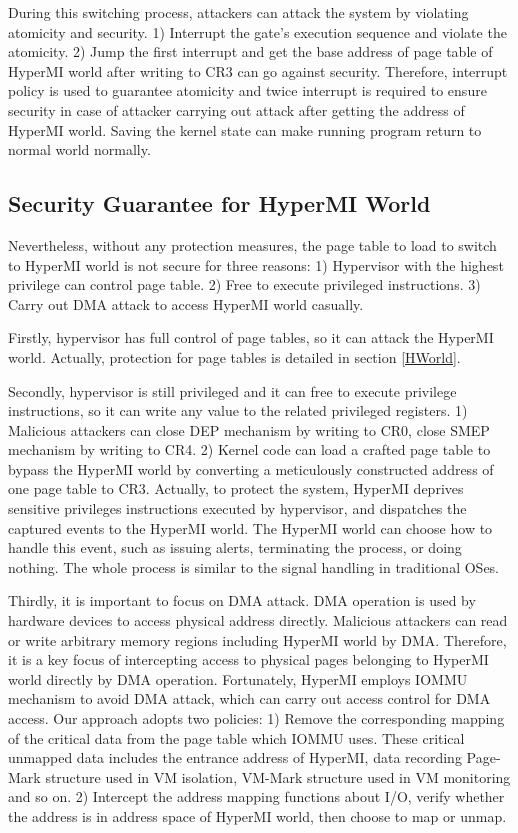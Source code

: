 \documentclass[conference]{IEEEtran}
\begin{document}
During this switching process, attackers can attack the system by violating atomicity and security. 1) Interrupt the gate's execution sequence and violate the atomicity. 2) Jump the first interrupt and get the base address of page table of HyperMI world after writing to CR3 can go against security. Therefore, interrupt policy is used to guarantee atomicity and twice interrupt is required to ensure security in case of attacker carrying out attack after getting the address of HyperMI world. Saving the kernel state can make running program return to normal world normally. 

\subsection{Security Guarantee for HyperMI World}\label {SG}
Nevertheless, without any protection measures, the page table to load to switch to HyperMI world is not secure for three reasons: 1) Hypervisor with the highest privilege can control page table. 2) Free to execute privileged instructions. 3) Carry out DMA attack to access HyperMI world casually.

Firstly, hypervisor has full control of page tables, so it can attack the HyperMI world. Actually, protection for page tables is detailed in section \ref{HWorld}. 

Secondly, hypervisor is still privileged and it can free to execute privilege instructions, so it can write any value to the related privileged registers. 1) Malicious attackers can close DEP mechanism by writing to CR0, close SMEP mechanism by writing to CR4. 2) Kernel code can load a crafted page table to bypass the HyperMI world by converting a meticulously constructed address of one page table to CR3.
Actually, to protect the system, HyperMI deprives sensitive privileges instructions executed by hypervisor, and dispatches the captured events to the HyperMI world. The HyperMI world can choose how to handle this event, such as issuing alerts, terminating the process, or doing nothing. The whole process is similar to the signal handling in traditional OSes.

Thirdly, it is important to focus on DMA attack. DMA operation is used by hardware devices to access physical address directly. Malicious attackers can read or write arbitrary memory regions including HyperMI world by DMA. Therefore, it is a key focus of intercepting access to physical pages belonging to HyperMI world directly by DMA operation. 
Fortunately, HyperMI employs IOMMU mechanism to avoid DMA attack, which can carry out access control for DMA access. Our approach adopts two policies: 1) Remove the corresponding mapping of the critical data from the page table which IOMMU uses. These critical unmapped data includes the entrance address of HyperMI, data recording Page-Mark structure used in VM isolation, VM-Mark structure used in VM monitoring and so on. 2) Intercept the address mapping functions about I/O, verify whether the address is in address space of HyperMI world, then choose to map or unmap.
\end{document}
